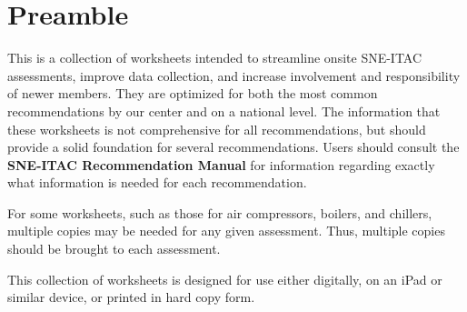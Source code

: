 \maketitle

\section*{Preamble}

This is a collection of worksheets intended to streamline onsite SNE-ITAC assessments, improve data collection, and increase involvement and responsibility of newer members. They are optimized for both the most common recommendations by our center and on a national level. The information that these worksheets is not comprehensive for all recommendations, but should provide a solid foundation for several recommendations. Users should consult the \textbf{SNE-ITAC Recommendation Manual} for information regarding exactly what information is needed for each recommendation. 

For some worksheets, such as those for air compressors, boilers, and chillers, multiple copies may be needed for any given assessment. Thus, multiple copies should be brought to each assessment. 

This collection of worksheets is designed for use either digitally, on an iPad or similar device, or printed in hard copy form. 

\clearpage